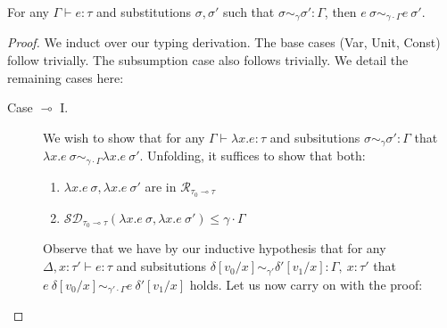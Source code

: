 
\begin{theorem}
  For any $\Gamma \vdash e : \tau$ and substitutions $\sigma, \sigma'$ such that
  $\sigma \sim_{\gamma} \sigma' : \Gamma$, then 
  $e~\sigma \sim_{\gamma \cdot \Gamma} e~\sigma'$.
\end{theorem}
\begin{proof}
  We induct over our typing derivation. The base cases (Var, Unit, Const) follow
  trivially. The subsumption case also follows trivially. We detail the
  remaining cases here:
  \begin{description}
    \item[Case $\multimap$ I.] 
      We wish to show that for any $\Gamma \vdash \lambda x . e : \tau$ and
      subsitutions $\sigma \sim_{\gamma} \sigma' : \Gamma$ that $\lambda x .
      e~\sigma \sim_{\gamma \cdot \Gamma} \lambda x . e~\sigma'$. Unfolding, it
      suffices to show that both:
      \begin{enumerate}
        \item $\lambda x . e~\sigma, \lambda x . e~\sigma'$ are in
          $\mathcal{R}_{\tau_0 \multimap \tau}$
        \item $\mathcal{SD}_{\tau_0 \multimap \tau}(\lambda x . e~\sigma,
          \lambda x . e~\sigma') \leq \gamma \cdot \Gamma$
      \end{enumerate}
    
      Observe that we have by our inductive hypothesis that for any $\Delta, x:
      \tau' \vdash e : \tau$ and subsitutions 
      $\delta[v_0/x] \sim_{\gamma'} \delta'[v_1/x] : \Gamma,~x : \tau'$ that 
      $e~\delta[v_0/x] \sim_{\gamma' \cdot \Gamma} e~\delta'[v_1/x]$ holds. 
      Let us now carry on with the proof:


\end{description}
\end{proof}
